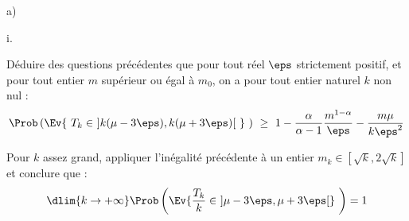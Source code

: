 \begin{liste}{a)}
\begin{nonoliste}{i.}
    




  \item Déduire des questions précédentes que pour tout réel $\eps$
    strictement positif, et pour tout entier $m$ supérieur ou égal à
    $m_{0}$, on a pour tout entier naturel $k$ non nul :
    \[
    \Prob\left(\Ev{\ T_{k} \in \ ]k(\mu - 3 \eps), k(\mu + 3 \eps)[ \
      } \ \right) \ \geq \ 1 - \dfrac{\alpha}{\alpha-1}
    \dfrac{m^{1-\alpha}}{\eps} - \dfrac{m \mu}{k \eps^{2}}
    \]

    

  \item Pour $k$ assez grand, appliquer l'inégalité précédente à un
    entier $m_{k} \in [\sqrt{k}, 2\sqrt{k}]$ et conclure que :
    \[
    \dlim{k \to + \infty} \Prob\left(\Ev{\frac{T_{k}}{k} \in \ ] \mu -
        3 \eps, \mu + 3 \eps[} \ \right) = 1
    \]

    
  \end{nonoliste}
\end{liste}




